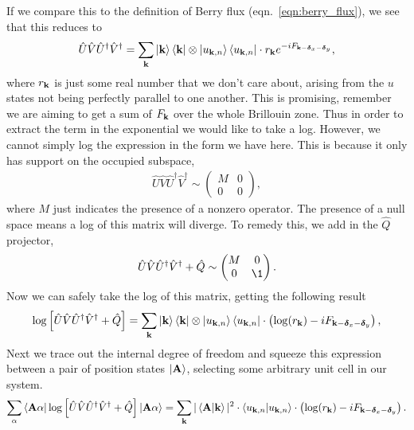 If we compare this to the definition of Berry flux (eqn.~\ref{eqn:berry_flux}), we see that this reduces to
\begin{align}
	\hat U\hat V\hat U^\dag \hat V^\dag = \sum_{\bf k} \ket{\bf k } \bra{\bf k } \otimes  \ket {u_{\bf k, n}} \bra{u_{\bf k, n}} \cdot r_{\bf k} e^{-i F_{\bf k-\boldsymbol{\delta}_x-\boldsymbol{\delta}_y}},
\end{align}
where $r_{\bf k}$ is just some real number that we don't care about, arising from the $u$ states not being perfectly parallel to one another. This is promising, remember we are aiming to get a sum of $F_{\bf k}$ over the whole Brillouin zone. Thus in order to extract the term in the exponential we would like to take a log. However, we cannot simply log the expression in the form we have here. This is because it only has support on the occupied subspace,
\begin{align}
    \hat U\hat V\hat U^\dag \hat V^\dag \sim \begin{pmatrix}
M &0 \\ 
 0& 0
\end{pmatrix},
\end{align}
where $M$ just indicates the presence of a nonzero operator. The presence of a null space means a log of this matrix will diverge. To remedy this, we add in the $\hat Q$ projector, 
\begin{align}
    \hat U\hat V\hat U^\dag \hat V^\dag  + \hat Q \sim \begin{pmatrix}
M &0 \\ 
 0& \1
\end{pmatrix}.
\end{align}
Now we can safely take the log of this matrix, getting the following result
\begin{align}
	\log \left [ \hat U\hat V\hat U^\dag \hat V^\dag + \hat Q \right ] = \sum_{\bf k} \ket{\bf k } \bra{\bf k } \otimes  \ket {u_{\bf k, n}} \bra{u_{\bf k, n}} \cdot \left ( \log(r_{\bf k})-i F_{\bf k-\boldsymbol{\delta}_x-\boldsymbol{\delta}_y}\right ),
\end{align}
Next we trace out the internal degree of freedom and squeeze this expression between a pair of position states $\ket {\bf A}$, selecting some arbitrary unit cell in our system. 
\begin{align}
	\sum_\alpha \bra{\bf A \alpha}\log \left [ \hat U\hat V\hat U^\dag \hat V^\dag + \hat Q \right ]   \ket{\bf A \alpha} = \sum_{\bf k} |\braket{\bf A|\bf k}|^2 \cdot  \braket{u_{\bf k, n}|u_{\bf k, n} } \cdot \left ( \log(r_{\bf k})-i F_{\bf k-\boldsymbol{\delta}_x-\boldsymbol{\delta}_y}\right ).
\end{align}
